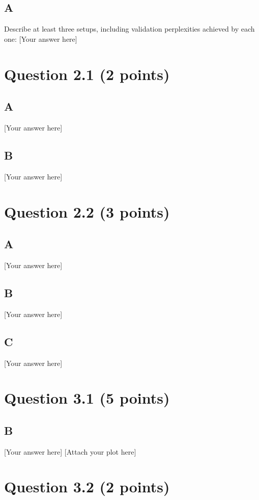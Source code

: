 \documentclass{article}
\begin{document}
\subsection*{A}
Describe at least three setups, including validation perplexities achieved by each one: [Your answer here]


\section*{Question 2.1 (2 points)}

\subsection*{A} [Your answer here] 

\subsection*{B} [Your answer here] 

\section*{Question 2.2 (3 points)}

\subsection*{A} [Your answer here] 

\subsection*{B} [Your answer here] 

\subsection*{C} [Your answer here] 

\section*{Question 3.1 (5 points)}

\subsection*{B} [Your answer here] [Attach your plot here]

\section*{Question 3.2 (2 points)}
\end{document}

